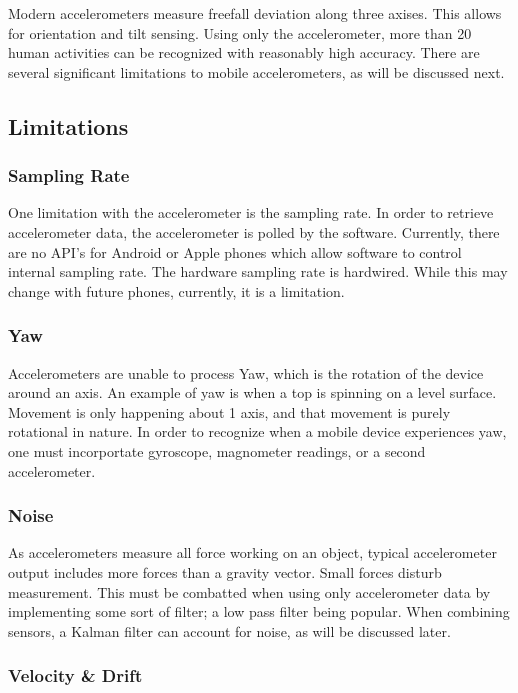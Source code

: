 \documentclass{acm_proc_article-sp}
\begin{document}
Modern accelerometers measure freefall deviation along three axises.  This allows 
for orientation and tilt sensing.  Using only the accelerometer, more than 20 human activities can be recognized
with reasonably high accuracy.\cite{wang2009framework}  There are several
significant limitations to mobile accelerometers, as will be discussed next.

\subsection{Limitations}
\subsubsection{Sampling Rate}
One limitation with the accelerometer is the sampling rate.  In order to retrieve accelerometer data,
the accelerometer is polled by the software.  Currently, there are no API's for Android
or Apple phones which allow software to control internal sampling rate.  
The hardware sampling rate is hardwired.\cite{brezmes2009activity}  While this may change
with future phones, currently, it is a limitation.

\subsubsection{Yaw}

Accelerometers are unable to process Yaw, which is the rotation of the device around an axis.  An example
of yaw is when a top is spinning on a level surface.  Movement is only happening about 1 axis, and that movement
is purely rotational in nature.  In order to recognize when a mobile device experiences yaw, one
must incorportate gyroscope, magnometer readings, or a second accelerometer.\cite{ashrafi2001relative}

\subsubsection{Noise}
As accelerometers measure all force working on an object, typical accelerometer
output includes more forces than a gravity vector.  Small forces disturb measurement.  This must
be combatted when using only accelerometer data by implementing some sort of filter; a low pass filter being popular.  When combining sensors, a Kalman filter can account for noise, as will be discussed later.

\subsubsection{Velocity \& Drift}
\end{document}
